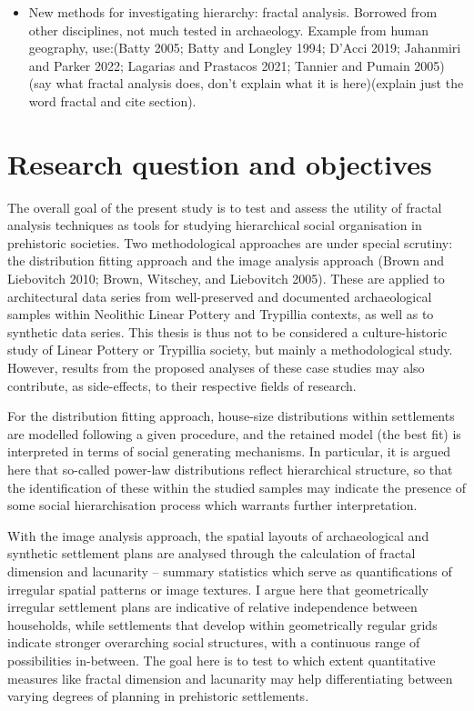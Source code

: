 \documentclass[
  12pt,
]{book}
\begin{document}
\begin{itemize}
\item
  New methods for investigating hierarchy: fractal analysis. Borrowed from other disciplines, not much tested in archaeology. Example from human geography, use:(Batty 2005; Batty and Longley 1994; D'Acci 2019; Jahanmiri and Parker 2022; Lagarias and Prastacos 2021; Tannier and Pumain 2005) (say what fractal analysis does, don't explain what it is here)(explain just the word fractal and cite section).
\end{itemize}

\hypertarget{research-question-and-objectives}{%
\section{Research question and objectives}\label{research-question-and-objectives}}

The overall goal of the present study is to test and assess the utility of fractal analysis techniques as tools for studying hierarchical social organisation in prehistoric societies. Two methodological approaches are under special scrutiny: the distribution fitting approach and the image analysis approach (Brown and Liebovitch 2010; Brown, Witschey, and Liebovitch 2005). These are applied to architectural data series from well-preserved and documented archaeological samples within Neolithic Linear Pottery and Trypillia contexts, as well as to synthetic data series. This thesis is thus not to be considered a culture-historic study of Linear Pottery or Trypillia society, but mainly a methodological study. However, results from the proposed analyses of these case studies may also contribute, as side-effects, to their respective fields of research.

For the distribution fitting approach, house-size distributions within settlements are modelled following a given procedure, and the retained model (the best fit) is interpreted in terms of social generating mechanisms. In particular, it is argued here that so-called power-law distributions reflect hierarchical structure, so that the identification of these within the studied samples may indicate the presence of some social hierarchisation process which warrants further interpretation.

With the image analysis approach, the spatial layouts of archaeological and synthetic settlement plans are analysed through the calculation of fractal dimension and lacunarity -- summary statistics which serve as quantifications of irregular spatial patterns or image textures. I argue here that geometrically irregular settlement plans are indicative of relative independence between households, while settlements that develop within geometrically regular grids indicate stronger overarching social structures, with a continuous range of possibilities in-between. The goal here is to test to which extent quantitative measures like fractal dimension and lacunarity may help differentiating between varying degrees of planning in prehistoric settlements.
\end{document}
